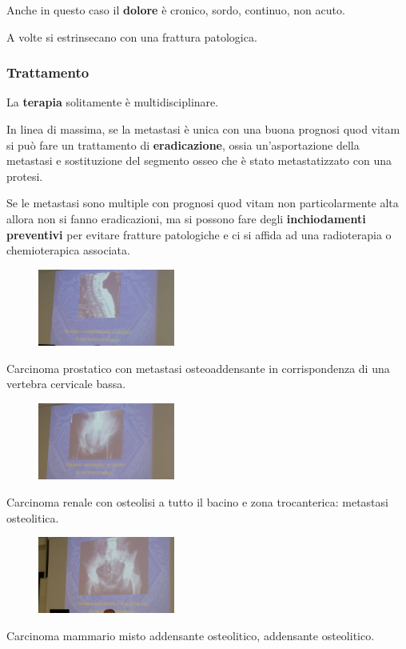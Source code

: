 Anche in questo caso il \textbf{dolore} è cronico, sordo, continuo, non acuto.

A volte si estrinsecano con una frattura patologica.

\subsubsection{Trattamento}

La \textbf{terapia} solitamente è multidisciplinare.

In linea di massima, se la metastasi è unica con una buona prognosi quod vitam si può fare un trattamento di \textbf{eradicazione}, ossia un'asportazione della metastasi e sostituzione del segmento osseo che è
stato metastatizzato con una protesi.

Se le metastasi sono multiple con prognosi quod vitam non
particolarmente alta allora non si fanno eradicazioni, ma si possono fare degli \textbf{inchiodamenti preventivi} per evitare fratture patologiche e ci si affida ad una radioterapia o chemioterapica associata.

\begin{figure}[!ht]
\centering
\includegraphics[width=0.4\textwidth]{011/image3.jpeg}
\end{figure}

Carcinoma prostatico con metastasi osteoaddensante in corrispondenza di una vertebra cervicale bassa.

\begin{figure}[!ht]
\centering
\includegraphics[width=0.4\textwidth]{011/image4.jpeg}
\end{figure}

Carcinoma renale con osteolisi a tutto il bacino e zona trocanterica: metastasi osteolitica.

\begin{figure}[!ht]
\centering
\includegraphics[width=0.4\textwidth]{011/image5.jpeg}
\end{figure}

Carcinoma mammario misto addensante osteolitico, addensante osteolitico.
